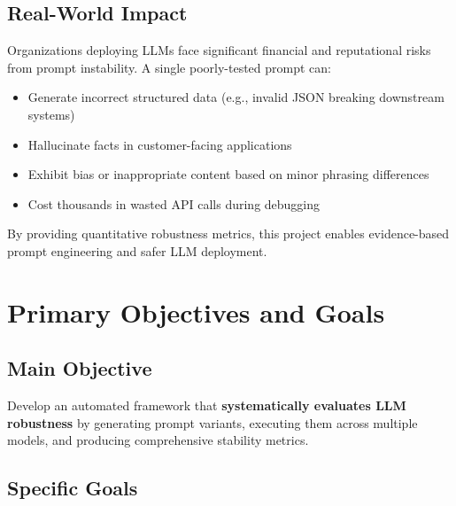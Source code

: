 \documentclass[11pt,a4paper]{article}
\begin{document}
\subsection{Real-World Impact}

Organizations deploying LLMs face significant financial and reputational risks from prompt instability. A single poorly-tested prompt can:

\begin{itemize}[leftmargin=*]
    \item Generate incorrect structured data (e.g., invalid JSON breaking downstream systems)
    \item Hallucinate facts in customer-facing applications
    \item Exhibit bias or inappropriate content based on minor phrasing differences
    \item Cost thousands in wasted API calls during debugging
\end{itemize}

By providing quantitative robustness metrics, this project enables evidence-based prompt engineering and safer LLM deployment.

\section{Primary Objectives and Goals}

\subsection{Main Objective}

Develop an automated framework that \textbf{systematically evaluates LLM robustness} by generating prompt variants, executing them across multiple models, and producing comprehensive stability metrics.

\subsection{Specific Goals}
\end{document}
